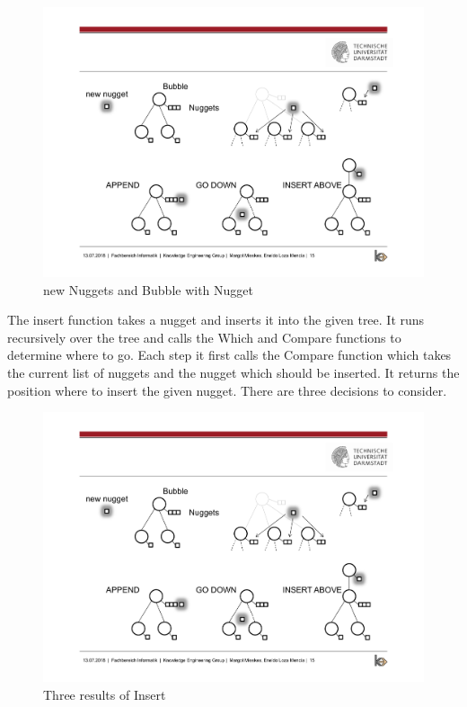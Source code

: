\begin{figure}[H]
	\centering
	\includegraphics[trim=3cm 10cm 15cm 5.8cm, clip=true]{img/step2_func.pdf}
	\caption{new Nuggets and Bubble with Nugget}
	\label{fig:nuggetbubble}
\end{figure}

The insert function takes a nugget and inserts it into the given tree. It runs recursively over the tree and calls the Which and Compare functions to determine where to go. Each step it first calls the Compare function which takes the current list of nuggets and the nugget which should be inserted. It returns the position where to insert the given nugget. There are three decisions to consider.
\begin{figure}[H]
	\centering
	\includegraphics[trim=3.5cm 3cm 3cm 11cm, clip=true, width= \textwidth]{img/step2_func.pdf}
	\caption{Three results of Insert}
	\label{fig:insert}
\end{figure}

